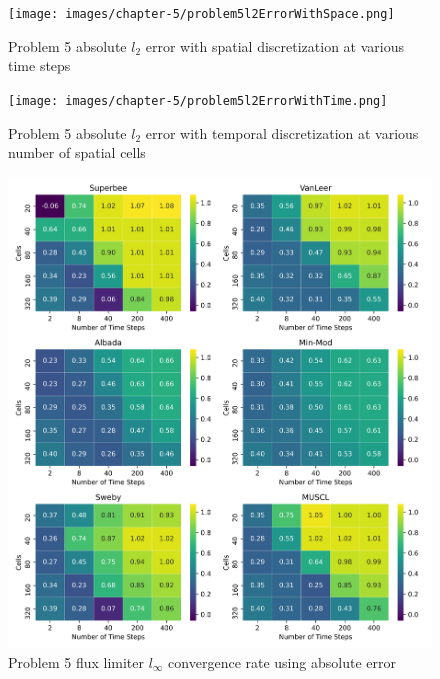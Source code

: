 \begin{figure}[p]
    \centering
    \texttt{[image: images/chapter-5/problem5l2ErrorWithSpace.png]}
    \caption{Problem 5 absolute $l_{2}$ error with spatial discretization at various time steps }
    \label{fig:problem5_l2error_spatial_results}
\end{figure}

\clearpage

\begin{figure}[p]
    \centering
    \texttt{[image: images/chapter-5/problem5l2ErrorWithTime.png]}
    \caption{Problem 5 absolute $l_{2}$ error with temporal discretization at various number of spatial cells}
    \label{fig:problem5_l2error_time_results}
\end{figure}

\clearpage

\begin{figure}[p]
    \centering
    \includegraphics[width=6in]{images/chapter-5/problem5linftyFluxLimiterConvergenceRate.png}
    \caption{Problem 5 flux limiter $l_{\infty}$ convergence rate using absolute error}
    \label{fig:problem5_linferror_fluxlimiter_convergence_rate}
\end{figure}

